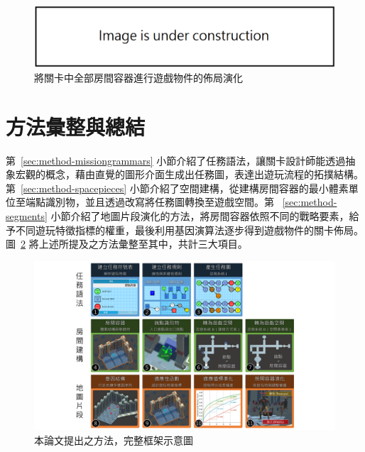 \begin{figure}[!htb]
  \begin{center}
    \includegraphics[width=1.0\textwidth]{figures/under_construction.png}
    \caption{將關卡中全部房間容器進行遊戲物件的佈局演化} 
    \label{fig:applied-ga-on-volume-all}
  \end{center}
\end{figure}

\section{方法彙整與總結}
\label{sec:method-summary}

第~\ref{sec:method-missiongrammars} 小節介紹了任務語法，讓關卡設計師能透過抽象宏觀的概念，藉由直覺的圖形介面生成出任務圖，表達出遊玩流程的拓撲結構。第~\ref{sec:method-spacepieces} 小節介紹了空間建構，從建構房間容器的最小體素單位至端點識別物，並且透過改寫將任務圖轉換至遊戲空間。第 ~\ref{sec:method-segments} 小節介紹了地圖片段演化的方法，將房間容器依照不同的戰略要素，給予不同遊玩特徵指標的權重，最後利用基因演算法逐步得到遊戲物件的關卡佈局。圖~\ref{fig:completed-framework} 將上述所提及之方法彙整至其中，共計三大項目。

\begin{landscape}
  \begin{figure}[!htb]
    \begin{center}
      \includegraphics[width=1.0\linewidth]{figures/completed-framework.pdf}
      \caption{本論文提出之方法，完整框架示意圖} 
      \label{fig:completed-framework}
    \end{center}
  \end{figure}
\end{landscape}